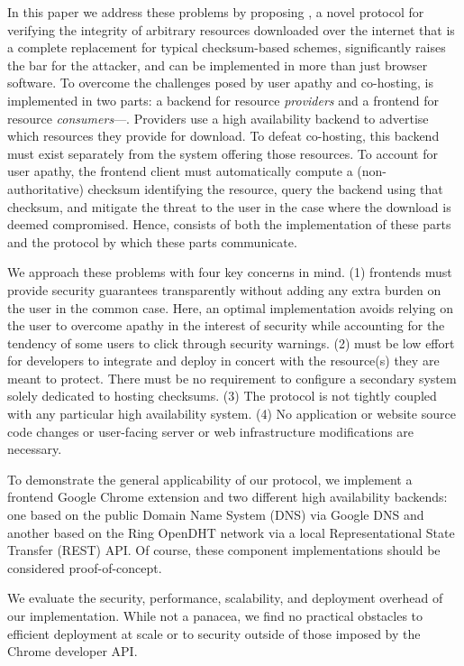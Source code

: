 In this paper we address these problems by proposing \SYSTEM{}, a novel protocol
for verifying the integrity of arbitrary resources downloaded over the internet
that is a complete replacement for typical checksum-based schemes, significantly
raises the bar for the attacker, and can be implemented in more than just
browser software. To overcome the challenges posed by user apathy and
co-hosting, \SYSTEM{} is implemented in two parts: a backend for resource
\emph{providers} and a frontend for resource \emph{consumers}---. Providers use a high availability backend to advertise which resources
they provide for download. To defeat co-hosting, this backend must exist
separately from the system offering those resources. To account for user apathy,
the frontend client must automatically compute a (non-authoritative) checksum
identifying the resource, query the backend using that checksum, and mitigate
the threat to the user in the case where the download is deemed compromised.
Hence, \SYSTEM{} consists of both the implementation of these parts and the
protocol by which these parts communicate.

We approach these problems with four key concerns in mind. (1) \SYSTEM{}
frontends must provide security guarantees transparently without adding any
extra burden on the user in the common case. Here, an optimal implementation
avoids relying on the user to overcome apathy in the interest of security while
accounting for the tendency of some users to click through security warnings.
(2) \SYSTEM{} must be low effort for developers to integrate and deploy in
concert with the resource(s) they are meant to protect. There must be no
requirement to configure a secondary system solely dedicated to hosting
checksums. (3) The protocol is not tightly coupled with any particular high
availability system. (4) No application or website source code changes or
user-facing server or web infrastructure modifications are necessary.

To demonstrate the general applicability of our protocol, we implement a
frontend Google Chrome extension and two different high availability backends:
one based on the public Domain Name System (DNS) via Google DNS and another
based on the Ring OpenDHT network via a local Representational State Transfer
(REST) API. Of course, these \SYSTEM{} component implementations should be
considered proof-of-concept.

We evaluate the security, performance, scalability, and deployment overhead of
our implementation. While not a panacea, we find no practical obstacles to
efficient deployment at scale or to security outside of those imposed by the
Chrome developer API.

